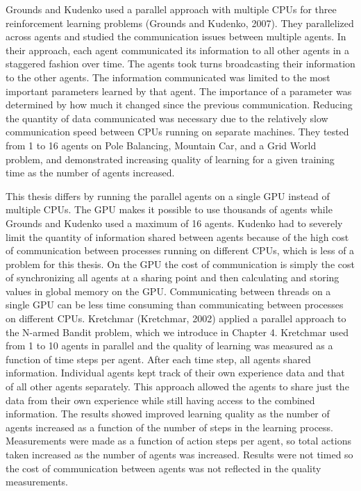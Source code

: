Grounds and Kudenko used a parallel approach with multiple CPUs for three reinforcement learning problems (Grounds and Kudenko, 2007).  They parallelized across agents and studied the communication issues between multiple agents.  In their approach, each agent communicated its information to all other agents in a staggered fashion over time.  The agents took turns broadcasting their information to the other agents.  The information communicated was limited to the most important parameters learned by that agent.  The importance of a parameter was determined by how much it changed since the previous communication.  Reducing the quantity of data communicated was necessary due to the relatively slow communication speed between CPUs running on separate machines.  They tested from 1 to 16 agents on Pole Balancing, Mountain Car, and a Grid World problem, and demonstrated increasing quality of learning for a given training time as the number of agents increased.

This thesis differs by running the parallel agents on a single GPU instead of multiple CPUs.  The GPU makes it possible to use thousands of agents while Grounds and Kudenko used a maximum of 16 agents.  Kudenko had to severely limit the quantity of information shared between agents because of the high cost of communication between processes running on different CPUs, which is less of a problem for this thesis.  On the GPU the cost of communication is simply the cost of synchronizing all agents at a sharing point and then calculating and storing values in global memory on the GPU.  Communicating between threads on a single GPU can be less time consuming than communicating between processes on different CPUs.
Kretchmar (Kretchmar, 2002) applied a parallel approach to the N-armed Bandit problem, which we introduce in Chapter 4.  Kretchmar used from 1 to 10 agents in parallel and the quality of learning was measured as a function of time steps per agent. After each time step, all agents shared information.  Individual agents kept track of their own experience data and that of all other agents separately.  This approach allowed the agents to share just the data from their own experience while still having access to the combined information.  The results showed improved learning quality as the number of agents increased as a function of the number of steps in the learning process.  Measurements were made as a function of action steps per agent, so total actions taken increased as the number of agents was increased.  Results were not timed so the cost of communication between agents was not reflected in the quality measurements.

